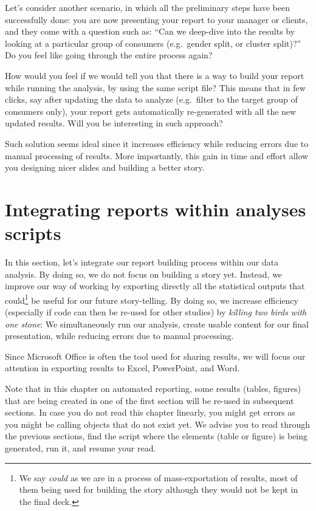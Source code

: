 \documentclass[
]{book}
\begin{document}
Let's consider another scenario, in which all the preliminary steps have been successfully done: you are now presenting your report to your manager or clients, and they come with a question such as: ``Can we deep-dive into the results by looking at a particular group of consumers (e.g.~gender split, or cluster split)?'' Do you feel like going through the entire process again?

How would you feel if we would tell you that there is a way to build your report while running the analysis, by using the same script file? This means that in few clicks, say after updating the data to analyze (e.g.~filter to the target group of consumers only), your report gets automatically re-generated with all the new updated results. Will you be interesting in such approach?

Such solution seems ideal since it increases efficiency while reducing errors due to manual processing of results. More importantly, this gain in time and effort allow you designing nicer slides and building a better story.

\hypertarget{integrating-reports-within-analyses-scripts}{%
\section{Integrating reports within analyses scripts}\label{integrating-reports-within-analyses-scripts}}

In this section, let's integrate our report building process within our data analysis. By doing so, we do not focus on building a story yet. Instead, we improve our way of working by exporting directly all the statistical outputs that could\footnote{We say \emph{could} as we are in a process of mass-exportation of results, most of them being used for building the story although they would not be kept in the final deck.} be useful for our future story-telling. By doing so, we increase efficiency (especially if code can then be re-used for other studies) by \emph{killing two birds with one stone}: We simultaneously run our analysis, create usable content for our final presentation, while reducing errors due to manual processing.

Since Microsoft Office is often the tool used for sharing results, we will focus our attention in exporting results to Excel, PowerPoint, and Word.

Note that in this chapter on automated reporting, some results (tables, figures) that are being created in one of the first section will be re-used in subsequent sections. In case you do not read this chapter linearly, you might get errors as you might be calling objects that do not exist yet. We advise you to read through the previous sections, find the script where the elements (table or figure) is being generated, run it, and resume your read.
\end{document}
